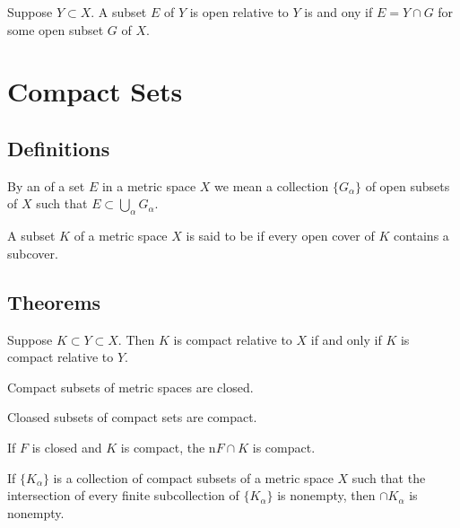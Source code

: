 \begin{thm}
	Suppose $Y \subset X$. A subset $E$ of $Y$ is open relative to $Y$ is and ony if $E = Y \cap G$ for some open subset $G$ of $X$.
\end{thm}

\section{Compact Sets}
\subsection{Definitions}
\begin{deff}
	By an {} of a set $E$ in a metric space $X$ we mean a collection $\{G_\alpha\}$ of open subsets of $X$ such that $E \subset \bigcup_\alpha G_\alpha$.
\end{deff}

\begin{deff}
	A subset $K$ of a metric space $X$ is said to be {} if every open cover of $K$ contains a {} subcover. 
\end{deff}

\subsection{Theorems}
\begin{thm}
	Suppose $K \subset Y \subset X$. Then $K$ is compact relative to $X$ if and only if $K$ is compact relative to $Y$. 
\end{thm}

\begin{thm}
	Compact subsets of metric spaces are closed.
\end{thm}

\begin{thm}
	Cloased subsets of compact sets are compact.
\end{thm}

\begin{thm}
	If $F$ is closed and $K$ is compact, the n$F \cap K$ is compact.
\end{thm}

\begin{thm}
	If $\{K_\alpha\}$ is a collection of compact subsets of a metric space $X$ such that the intersection of every finite subcollection of $\{K_\alpha\}$ is nonempty, then $\cap K_\alpha$ is nonempty.
\end{thm}

